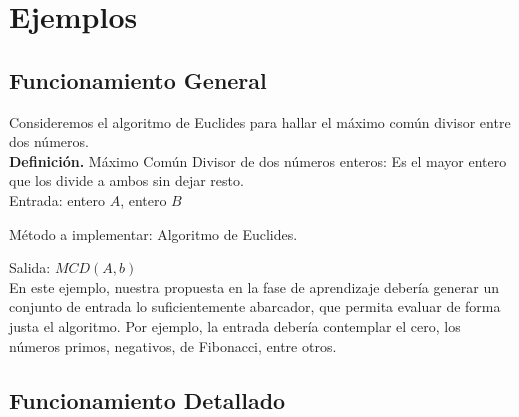 \documentclass[a4paper,12pt]{book}
\begin{document}
	
	
	
	\section{Ejemplos}
	
	\subsection{Funcionamiento General}
	
		Consideremos el algoritmo de Euclides para hallar el máximo común divisor entre dos números.\\
		
		\textbf{Definición.} Máximo Común Divisor de dos números enteros: Es el mayor entero que los divide a ambos sin dejar resto. \\
		
		Entrada: entero $A$, entero $B$ 
		
		Método a implementar: Algoritmo de Euclides.
		
		Salida: $MCD(A, b)$ \\
		
		En este ejemplo, nuestra propuesta en la fase de aprendizaje debería generar un conjunto de entrada lo suficientemente abarcador, que permita evaluar de forma justa el algoritmo. Por ejemplo, la entrada debería contemplar el cero, los números primos, negativos, de Fibonacci, entre otros.
		
	\subsection{Funcionamiento Detallado}
	
\end{document}

